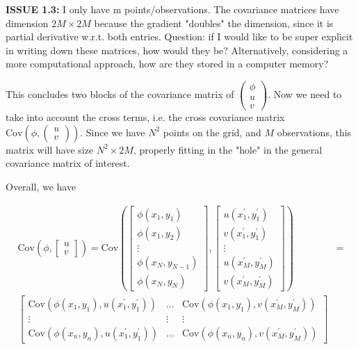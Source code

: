 \documentclass[11pt,a4paper]{article}
\newcommand{\icol}[1]{%
  \left(\begin{smallmatrix}#1\end{smallmatrix}\right)%
}
\begin{document}
\textbf{ISSUE 1.3:} I only have m points/observations. The covariance matrices have dimension $2M \times 2M$ because the gradient "doubles" the dimension, since it is partial derivative w.r.t. both entries. Question: if I would like to be super explicit in writing down these matrices, how would they be? Alternatively, considering a more computational approach, how are they stored in a computer memory? \newline

This concludes two blocks of the covariance matrix of $\icol{\phi \\ u \\ v }$. Now we need to take into account the cross terms, i.e. the cross covariance matrix $\text{Cov}(\phi, \icol{u \\ v } )$. Since we have $N^2$ points on the grid, and $M$ observations, this matrix will have size $N^2 \times 2M$, properly fitting in the "hole" in the general covariance matrix of interest. 

Overall, we have 

\begin{align*}
    \text{Cov}\left(\phi, \begin{bmatrix}
u \\ v
\end{bmatrix} \right) = 
\text{Cov}\left( \begin{bmatrix}
\phi(x_1, y_1) \\ \phi(x_1, y_2) \\ \vdots \\ \phi(x_N, y_{N-1}) \\ \phi(x_N, y_N)
\end{bmatrix}, \begin{bmatrix} 
u(x_1^\prime, y_1^\prime) \\ v(x_1^\prime, y_1^\prime) \\ \vdots \\ u(x_M^\prime, y_M^\prime) \\ v(x_M^\prime, y_M^\prime)
\end{bmatrix}
\right) &= \\ 
\begin{bmatrix}
\text{Cov}(\phi(x_1,y_1),u(x_1^\prime, y_1^\prime)) & \hdots & \text{Cov}(\phi(x_1,y_1),v(x_M^\prime, y_M^\prime)) \\
\vdots & \vdots & \vdots \\
\text{Cov}(\phi(x_n,y_n),u(x_1^\prime, y_1^\prime)) & \hdots & \text{Cov}(\phi(x_n,y_n),v(x_M^\prime, y_M^\prime)) 
\end{bmatrix}
\end{align*}
\newline
\end{document}
